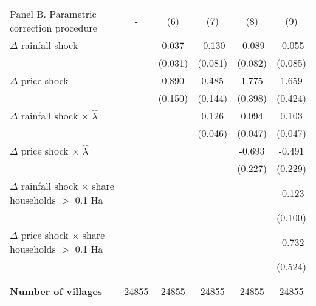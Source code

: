 \begin{table}[H]
\centering\begingroup\fontsize{10}{12}\selectfont

\begin{tabular}{lccccc}
\toprule
Panel B. Parametric correction procedure & - & (6) & (7) & (8) & (9)\\

$\Delta$ rainfall shock &  & 0.037 & -0.130 & -0.089 & -0.055\\
 &  & (0.031) & (0.081) & (0.082) & (0.085)\\
$\Delta$ price shock &  & 0.890 & 0.485 & 1.775 & 1.659\\
 &  & (0.150) & (0.144) & (0.398) & (0.424)\\
$\Delta$ rainfall shock $\times$ $\widehat{\lambda}$ &  &  & 0.126 & 0.094 & 0.103\\
\addlinespace
 &  &  & (0.046) & (0.047) & (0.047)\\
$\Delta$ price shock $\times$ $\widehat{\lambda}$ &  &  &  & -0.693 & -0.491\\
 &  &  &  & (0.227) & (0.229)\\
$\Delta$ rainfall shock $\times$ share households $>$ 0.1 Ha &  &  &  &  & -0.123\\
 &  &  &  &  & (0.100)\\
\addlinespace
$\Delta$ price shock $\times$ share households $>$ 0.1 Ha &  &  &  &  & -0.732\\
 &  &  &  &  & (0.524)\\
 &  &  &  &  & \\
 &  &  &  &  & \\
\textbf{Number of villages} & 24855 & 24855 & 24855 & 24855 & 24855\\
\bottomrule
\end{tabular}
\endgroup{}
\end{table}
\bottomrule
